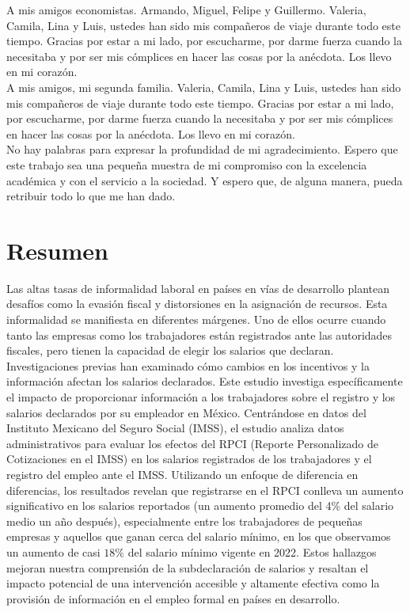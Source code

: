 \documentclass[10pt, oneside]{book}
\begin{document}
\noindent A mis amigos economistas. Armando, Miguel, Felipe y Guillermo. Valeria, Camila, Lina y Luis, ustedes han sido mis compañeros de viaje durante todo este tiempo. Gracias por estar a mi lado, por escucharme, por darme fuerza cuando la necesitaba y por ser mis cómplices en hacer las cosas por la anécdota. Los llevo en mi corazón. \\

\noindent A mis amigos, mi segunda familia. Valeria, Camila, Lina y Luis, ustedes han sido mis compañeros de viaje durante todo este tiempo. Gracias por estar a mi lado, por escucharme, por darme fuerza cuando la necesitaba y por ser mis cómplices en hacer las cosas por la anécdota. Los llevo en mi corazón. \\

\noindent No hay palabras para expresar la profundidad de mi agradecimiento. Espero que este trabajo sea una pequeña muestra de mi compromiso con la excelencia académica y con el servicio a la sociedad. Y espero que, de alguna manera, pueda retribuir todo lo que me han dado.


\chapter*{Resumen}

\noindent Las altas tasas de informalidad laboral en países en vías de desarrollo plantean desafíos como la evasión fiscal y distorsiones en la asignación de recursos. Esta informalidad se manifiesta en diferentes márgenes. Uno de ellos ocurre cuando tanto las empresas como los trabajadores están registrados ante las autoridades fiscales, pero tienen la capacidad de elegir los salarios que declaran. Investigaciones previas han examinado cómo cambios en los incentivos y la información afectan los salarios declarados. Este estudio investiga específicamente el impacto de proporcionar información a los trabajadores sobre el registro y los salarios declarados por su empleador en México. Centrándose en datos del Instituto Mexicano del Seguro Social (IMSS), el estudio analiza datos administrativos para evaluar los efectos del RPCI (Reporte Personalizado de Cotizaciones en el IMSS) en los salarios registrados de los trabajadores y el registro del empleo ante el IMSS. Utilizando un enfoque de diferencia en diferencias, los resultados revelan que registrarse en el RPCI conlleva un aumento significativo en los salarios reportados (un aumento promedio del 4\% del salario medio un año después), especialmente entre los trabajadores de pequeñas empresas y aquellos que ganan cerca del salario mínimo, en los que observamos un aumento de casi $18\%$ del salario mínimo vigente en 2022. Estos hallazgos mejoran nuestra comprensión de la subdeclaración de salarios y resaltan el impacto potencial de una intervención accesible y altamente efectiva como la provisión de información en el empleo formal en países en desarrollo.
\end{document}
